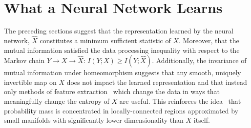 \label{chap:conclusion}

\section{What a Neural Network Learns}
The preceding sections suggest that the representation learned by the neural network, $\hat{X}$ constitutes a minimum sufficient statistic of $X$. 
Moreover, that the mutual information satisfied the data processing inequality with respect to the Markov chain $Y \to X \to \hat{X}$: $I(Y; X) \geq I(Y; \hat{X})$.
Additionally, the invariance of mutual information under homeomorphism suggests that any smooth, uniquely invertible map on $X$ does not impact the learned representation and that instead only methods of feature extraction~\cite{goodfellow2016deep} which change the data in ways that meaningfully change the entropy of $X$ are useful.
This reinforces the idea~\cite{goodfellow2014explaining} that probability mass is concentrated in locally-connected regions approximated by small manifolds with significantly lower dimensionality than $X$ itself.